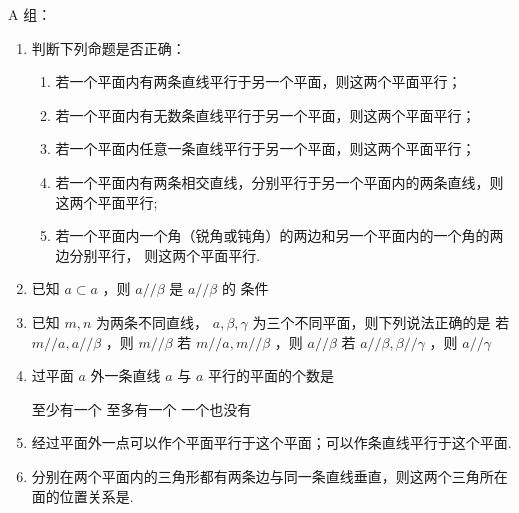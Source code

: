 A 组：
\begin{enumerate}

\item 判断下列命题是否正确：

    \begin{enumerate}
        \item 若一个平面内有两条直线平行于另一个平面，则这两个平面平行；

        \item 若一个平面内有无数条直线平行于另一个平面，则这两个平面平行； 

        \item 若一个平面内任意一条直线平行于另一个平面，则这两个平面平行； 

        \item 若一个平面内有两条相交直线，分别平行于另一个平面内的两条直线，则这两个平面平行; 

        \item 若一个平面内一个角（锐角或钝角）的两边和另一个平面内的一个角的两边分别平行， 则这两个平面平行. 

        
    \end{enumerate}

    \item 已知 $ a \subset  a $ ，则 $ a//\beta $ 是 $ a//\beta $ 的 条件

    \item 已知 $ m,n $ 为两条不同直线， $ a,\beta ,\gamma $ 为三个不同平面，则下列说法正确的是
     {若 $ m//a,a//\beta $ ，则 $ m//\beta $}
    {若 $ m//a,m//\beta $ ，则 $ a//\beta $} {若 $ a//\beta ,\beta //\gamma $ ，则 $ a//\gamma $}

    \item 过平面 $ a $ 外一条直线 $ a $ 与 $ a $ 平行的平面的个数是 

     {至少有一个} {至多有一个} { 一个也没有}

    \item 经过平面外一点可以作个平面平行于这个平面；可以作条直线平行于这个平面.
    
    \item 分别在两个平面内的三角形都有两条边与同一条直线垂直，则这两个三角所在面的位置关系是.

\end{enumerate}


